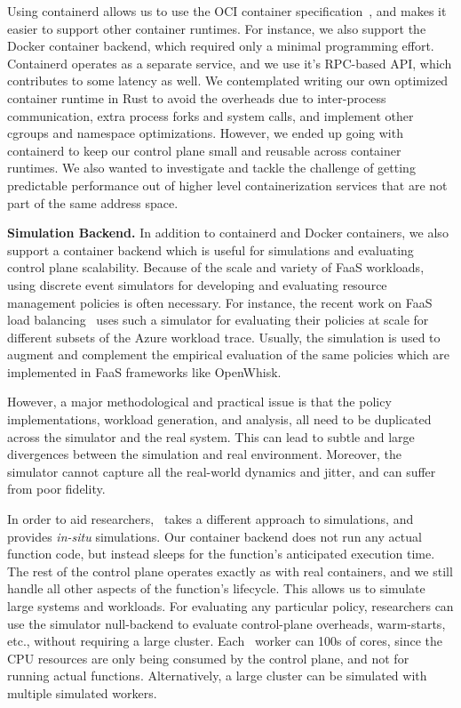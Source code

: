 Using containerd allows us to use the OCI container specification~\cite{oci}, and makes it easier to support other container runtimes.
For instance, we also support the Docker container backend, which required only a minimal programming effort.
Containerd operates as a separate service, and we use it's RPC-based API, which contributes to some latency as well.
We contemplated writing our own optimized container runtime in Rust to avoid the overheads due to inter-process communication, extra process forks and system calls, and implement other cgroups and namespace optimizations. 
However, we ended up going with containerd to keep our control plane small and reusable across container runtimes.
We also wanted to investigate and tackle the challenge of getting predictable performance out of higher level containerization services that are not part of the same address space. 


\noindent \textbf{Simulation Backend.}
In addition to containerd and Docker containers, we also support a  container backend which is useful for simulations and evaluating control plane scalability.
%
Because of the scale and variety of FaaS workloads, using discrete event simulators for developing and evaluating resource management policies is often necessary.
%
For instance, the recent work on FaaS load balancing~\cite{faaslb-hpdc22} uses such a simulator for evaluating their policies at scale for different subsets of the Azure workload trace.
Usually, the simulation is used to augment and complement the  empirical evaluation of the same policies which are implemented in FaaS frameworks like OpenWhisk. 

However, a major methodological and practical issue is that the policy implementations, workload generation, and analysis, all need to be duplicated across the simulator and the real system.
This can lead to subtle and large divergences between the simulation and real environment. 
Moreover, the simulator cannot capture all the real-world dynamics and jitter, and can suffer from poor fidelity.

In order to aid researchers, \sysname~takes a different approach to simulations, and provides \emph{in-situ} simulations. 
Our  container backend does not run any actual function code, but instead sleeps for the function's anticipated execution time.
The rest of the control plane operates exactly as with real containers, and we still handle all other aspects of the function's lifecycle.
%
This allows us to simulate large systems and workloads. 
For evaluating any particular policy, researchers can use the simulator null-backend to evaluate control-plane overheads, warm-starts, etc., without requiring a large cluster.
Each \sysname~worker can  100s of cores, since the CPU resources are only being consumed by the control plane, and not for running actual functions.
Alternatively, a large cluster can be simulated with multiple simulated workers. 

